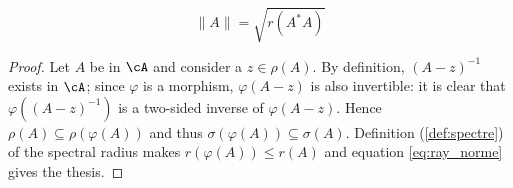 \begin{proposition}
\begin{equation}\label{eq:ray_norme}
\|A\|=\sqrt{ r(A^*A) }
\end{equation}
\end{proposition}

\begin{proof}
Let $A$ be in $\cA$ and consider a $z\in\rho(A)$. By definition, $(A-z)^{-1}$ exists in $\cA$; since $\varphi$ is a morphism, $\varphi(A-z)$ is also invertible: it is clear that $\varphi( (A-z)^{-1} )$ is a two-sided inverse of $\varphi(A-z)$. Hence $\rho(A)\subseteq\rho(\varphi(A))$ and thus $\sigma(\varphi(A))\subseteq\sigma(A)$. Definition (\ref{def:spectre}) of the spectral radius makes $r(\varphi(A))\leq r(A)$ and equation \eqref{eq:ray_norme} gives the thesis.
\end{proof}


